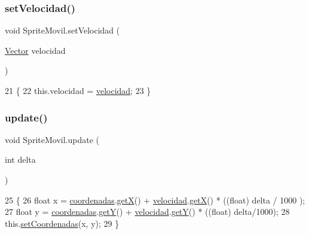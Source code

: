 \subsubsection{\texorpdfstring{set\+Velocidad()}{setVelocidad()}}
{\footnotesize\ttfamily void Sprite\+Movil.\+set\+Velocidad (\begin{DoxyParamCaption}\item[{\mbox{\hyperlink{class_vector}{Vector}}}]{velocidad }\end{DoxyParamCaption})\hspace{0.3cm}{\ttfamily [inline]}}


\begin{DoxyCode}
21                                                \{
22         this.velocidad = \mbox{\hyperlink{class_sprite_movil_a5f99cf7fe355c17b0dc3edb2f6fb4969}{velocidad}};
23     \}
\end{DoxyCode}
\mbox{\label{class_sprite_movil_a7d40c2a76b0be777aa231a971007637e}} 
\subsubsection{\texorpdfstring{update()}{update()}}
{\footnotesize\ttfamily void Sprite\+Movil.\+update (\begin{DoxyParamCaption}\item[{int}]{delta }\end{DoxyParamCaption})\hspace{0.3cm}{\ttfamily [inline]}}


\begin{DoxyCode}
25                                  \{
26         \textcolor{keywordtype}{float} x = \mbox{\hyperlink{class_sprite_ada651b6921cee54a619e11c4eb01526d}{coordenadas}}.\mbox{\hyperlink{class_coordenadas_a7b3fc725f9146220813dc0084fecc3ca}{getX}}() + \mbox{\hyperlink{class_sprite_movil_a5f99cf7fe355c17b0dc3edb2f6fb4969}{velocidad}}.\mbox{\hyperlink{class_vector_a3d9de615137bc20dd4f1d6aa8fefa167}{getX}}() * ((float) delta / 1000
      );
27         \textcolor{keywordtype}{float} y = \mbox{\hyperlink{class_sprite_ada651b6921cee54a619e11c4eb01526d}{coordenadas}}.\mbox{\hyperlink{class_coordenadas_aa10f46c8c62df3db3a05d4550f20b197}{getY}}() + \mbox{\hyperlink{class_sprite_movil_a5f99cf7fe355c17b0dc3edb2f6fb4969}{velocidad}}.\mbox{\hyperlink{class_vector_ac862d32aed23f8ca72176940f76dc1f9}{getY}}() * ((float) delta/1000);
28         this.\mbox{\hyperlink{class_sprite_ab6507a100fad450d688f71d08cc91715}{setCoordenadas}}(x, y);
29     \}
\end{DoxyCode}


